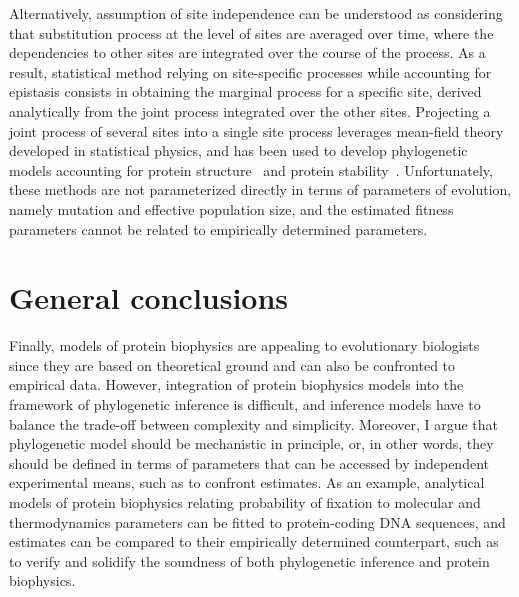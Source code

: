 Alternatively, assumption of site independence can be understood as considering that substitution process at the level of sites are averaged over time, where the dependencies to other sites are integrated over the course of the process.
As a result, statistical method relying on site-specific processes while accounting for epistasis consists in obtaining the marginal process for a specific site, derived analytically from the joint process integrated over the other sites.
Projecting a joint process of several sites into a single site process leverages mean-field theory developed in statistical physics, and has been used to develop phylogenetic models accounting for protein structure~\citep{Chi2018} and protein stability~\citep{Arenas2015a, Arenas2017}.
Unfortunately, these methods are not parameterized directly in terms of parameters of evolution, namely mutation and effective population size, and the estimated fitness parameters cannot be related to empirically determined parameters.

\section{General conclusions}

Finally, models of protein biophysics are appealing to evolutionary biologists since they are based on theoretical ground and can also be confronted to empirical data.
However, integration of protein biophysics models into the framework of phylogenetic inference is difficult, and inference models have to balance the trade-off between complexity and simplicity.
Moreover, I argue that phylogenetic model should be mechanistic in principle, or, in other words, they should be defined in terms of parameters that can be accessed by independent experimental means, such as to confront estimates.
As an example, analytical models of protein biophysics relating probability of fixation to molecular and thermodynamics parameters can be fitted to protein-coding \acrshort{DNA} sequences, and estimates can be compared to their empirically determined counterpart, such as to verify and solidify the soundness of both phylogenetic inference and protein biophysics.
